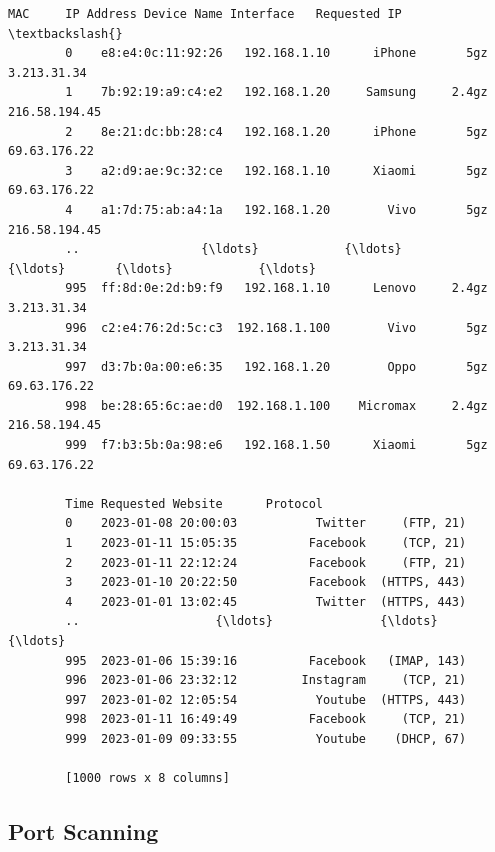 \documentclass[11pt]{article}
\makeatletter
\newcommand{\boxspacing}{\kern\kvtcb@left@rule\kern\kvtcb@boxsep}
\newcommand{\prompt}[4]{
    {\ttfamily\llap{{\color{#2}[#3]:\hspace{3pt}#4}}\vspace{-\baselineskip}}
}
\makeatother
\begin{document}
\begin{tcolorbox}[breakable, size=fbox, boxrule=.5pt, pad at break*=1mm, opacityfill=0]
    \prompt{Out}{outcolor}{38}{\boxspacing}
    \begin{Verbatim}[commandchars=\\\{\}]
        MAC     IP Address Device Name Interface   Requested IP  \textbackslash{}
        0    e8:e4:0c:11:92:26   192.168.1.10      iPhone       5gz    3.213.31.34
        1    7b:92:19:a9:c4:e2   192.168.1.20     Samsung     2.4gz  216.58.194.45
        2    8e:21:dc:bb:28:c4   192.168.1.20      iPhone       5gz   69.63.176.22
        3    a2:d9:ae:9c:32:ce   192.168.1.10      Xiaomi       5gz   69.63.176.22
        4    a1:7d:75:ab:a4:1a   192.168.1.20        Vivo       5gz  216.58.194.45
        ..                 {\ldots}            {\ldots}         {\ldots}       {\ldots}            {\ldots}
        995  ff:8d:0e:2d:b9:f9   192.168.1.10      Lenovo     2.4gz    3.213.31.34
        996  c2:e4:76:2d:5c:c3  192.168.1.100        Vivo       5gz    3.213.31.34
        997  d3:7b:0a:00:e6:35   192.168.1.20        Oppo       5gz   69.63.176.22
        998  be:28:65:6c:ae:d0  192.168.1.100    Micromax     2.4gz  216.58.194.45
        999  f7:b3:5b:0a:98:e6   192.168.1.50      Xiaomi       5gz   69.63.176.22

        Time Requested Website      Protocol
        0    2023-01-08 20:00:03           Twitter     (FTP, 21)
        1    2023-01-11 15:05:35          Facebook     (TCP, 21)
        2    2023-01-11 22:12:24          Facebook     (FTP, 21)
        3    2023-01-10 20:22:50          Facebook  (HTTPS, 443)
        4    2023-01-01 13:02:45           Twitter  (HTTPS, 443)
        ..                   {\ldots}               {\ldots}           {\ldots}
        995  2023-01-06 15:39:16          Facebook   (IMAP, 143)
        996  2023-01-06 23:32:12         Instagram     (TCP, 21)
        997  2023-01-02 12:05:54           Youtube  (HTTPS, 443)
        998  2023-01-11 16:49:49          Facebook     (TCP, 21)
        999  2023-01-09 09:33:55           Youtube    (DHCP, 67)

        [1000 rows x 8 columns]
    \end{Verbatim}
\end{tcolorbox}

\hypertarget{port-scanning}{%
    \subsection{Port Scanning}\label{port-scanning}}
\end{document}
